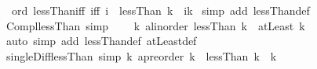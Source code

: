 \begin{isabellebody}
\isadelimdocument
%
\endisadelimdocument
%
\isatagdocument
%
\isamarkuptrue%
%
\endisatagdocument
{\isafolddocument}%
%
\isadelimdocument
%
\endisadelimdocument
{}\isamarkupfalse%
\ {\isacharparenleft}{\kern0pt}\ ord{\isacharparenright}{\kern0pt}\ lessThan{\isacharunderscore}{\kern0pt}iff\ {\isacharbrackleft}{\kern0pt}iff{\isacharbrackright}{\kern0pt}{\isacharcolon}{\kern0pt}\ {\isachardoublequoteopen}{\isacharparenleft}{\kern0pt}i\ {\isasymin}\ lessThan\ k{\isacharparenright}{\kern0pt}\ {\isacharequal}{\kern0pt}\ {\isacharparenleft}{\kern0pt}i{\isacharless}{\kern0pt}k{\isacharparenright}{\kern0pt}{\isachardoublequoteclose}\isanewline
%
\isadelimproof
%
\endisadelimproof
%
\isatagproof
{}\isamarkupfalse%
\ {\isacharparenleft}{\kern0pt}simp\ add{\isacharcolon}{\kern0pt}\ lessThan{\isacharunderscore}{\kern0pt}def{\isacharparenright}{\kern0pt}%
\endisatagproof
{\isafoldproof}%
%
\isadelimproof
\isanewline
%
\endisadelimproof
\isanewline
{}\isamarkupfalse%
\ Compl{\isacharunderscore}{\kern0pt}lessThan\ {\isacharbrackleft}{\kern0pt}simp{\isacharbrackright}{\kern0pt}{\isacharcolon}{\kern0pt}\isanewline
\ \ \ \ {\isachardoublequoteopen}{\isacharbang}{\kern0pt}{\isacharbang}{\kern0pt}k{\isacharcolon}{\kern0pt}{\isacharcolon}{\kern0pt}\ {\isacharprime}{\kern0pt}a{\isacharcolon}{\kern0pt}{\isacharcolon}{\kern0pt}linorder{\isachardot}{\kern0pt}\ {\isacharminus}{\kern0pt}lessThan\ k\ {\isacharequal}{\kern0pt}\ atLeast\ k{\isachardoublequoteclose}\isanewline
%
\isadelimproof
\ \ %
\endisadelimproof
%
\isatagproof
{}\isamarkupfalse%
\ {\isacharparenleft}{\kern0pt}auto\ simp\ add{\isacharcolon}{\kern0pt}\ lessThan{\isacharunderscore}{\kern0pt}def\ atLeast{\isacharunderscore}{\kern0pt}def{\isacharparenright}{\kern0pt}%
\endisatagproof
{\isafoldproof}%
%
\isadelimproof
\isanewline
%
\endisadelimproof
\isanewline
{}\isamarkupfalse%
\ single{\isacharunderscore}{\kern0pt}Diff{\isacharunderscore}{\kern0pt}lessThan\ {\isacharbrackleft}{\kern0pt}simp{\isacharbrackright}{\kern0pt}{\isacharcolon}{\kern0pt}\ {\isachardoublequoteopen}{\isacharbang}{\kern0pt}{\isacharbang}{\kern0pt}k{\isacharcolon}{\kern0pt}{\isacharcolon}{\kern0pt}\ {\isacharprime}{\kern0pt}a{\isacharcolon}{\kern0pt}{\isacharcolon}{\kern0pt}preorder{\isachardot}{\kern0pt}\ {\isacharbraceleft}{\kern0pt}k{\isacharbraceright}{\kern0pt}\ {\isacharminus}{\kern0pt}\ lessThan\ k\ {\isacharequal}{\kern0pt}\ {\isacharbraceleft}{\kern0pt}k{\isacharbraceright}{\kern0pt}{\isachardoublequoteclose}\isanewline

\end{isabellebody}
